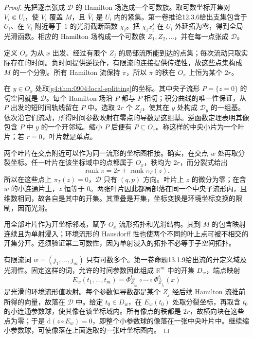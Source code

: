 \begin{proof}
	先把逐点张成 \(\mathcal D\) 的 Hamilton 场选成一个可数族。取可数坐标开集对 \(V_i\Subset U_i\)，使 \(V_i\) 覆盖 \(M\)，且 \(\overline V_i\) 是 \(U_i\) 内的紧集。第一卷推论12.3.6给出支集包含于 \(U_i\)、在 \(\overline V_i\) 附近等于 \(1\) 的光滑截断函数 \(\chi_i\)。把 \(\chi_i x_i^j\) 在 \(U_i\) 外延拓为零，得到全局光滑函数。相应的 Hamilton 场构成一个可数族 \(Z_1,Z_2,\ldots\)，并在每一点张成 \(\mathcal D\)。

	定义 \(O_x\) 为从 \(x\) 出发、经过有限个 \(Z_j\) 的局部流所能到达的点集；每次流动只取实际存在的时间。负时间提供逆操作，有限流的连接提供传递性，故这些点集构成 \(M\) 的一个分割。所有 Hamilton 流保持 \(\pi\)，所以 \(\pi\) 的秩在 \(O_x\) 上恒为某个 \(2r\)。

	在 \(y\in O_x\) 处取\cref{g4:thm:0904:local-splitting}的坐标。其中央子流形 \(P=\{z=0\}\) 的切空间就是 \(\mathcal D\)。每个 Hamilton 场沿 \(P\) 都与 \(P\) 相切；积分曲线的唯一性保证，从 \(P\) 出发的短时间轨线留在 \(P\) 中。选取 \(2r\) 个 \(Z_j\)，使其在 \(y\) 处构成 \(\mathcal D_y\) 的一组基。依次沿它们流动，所得时间参数映射在零点的导数是这组基。逆函数定理表明其像包含 \(P\) 中 \(y\) 的一个开邻域。缩小 \(P\) 后便有 \(P\subseteq O_x\)。称这样的中央小片为一个叶片；若 \(r=0\)，叶片就是单点。

	两个叶片在交点附近可以作为同一流形的坐标图相接。确实，在交点 \(w\) 处再取分裂坐标。任一叶片在该坐标域中的点都属于 \(O_x\)，秩均为 \(2r\)，而分裂式给出
	\[
		\operatorname{rank}\pi=2r+\operatorname{rank}\pi_T(z).
	\]
	所以在这些点上 \(\pi_T(z)=0\)，\(\mathcal D\) 只有 \((q,p)\) 方向。叶片上 \(z\) 的微分为零；在含 \(w\) 的小连通片上，\(z\) 恒等于 \(0\)。两张叶片因此都局部落在同一个中央子流形内，且维数相同，故各自是其中的开集。其重叠是开集，坐标变换是环境坐标变换的限制，因而光滑。

	用全部叶片作为开坐标邻域，赋予 \(O_x\) 流形拓扑和光滑结构。其到 \(M\) 的包含映射连续且为单射浸入；环境流形的 Hausdorff 性也使两个不同的叶上点可被不相交的开集分开。还须验证第二可数性，因为单射浸入的拓扑不必等于子空间拓扑。

	有限流词 \(w=(j_1,\ldots,j_m)\) 只有可数多个。第一卷命题13.1.9给出流的开定义域及光滑性。固定这样的词，允许的时间参数因此组成 \(\mathbb R^m\) 中的开集 \(D_w\)，端点映射
	\[
		E_w(t_1,\ldots,t_m)
		=\Phi_{Z_{j_m}}^{t_m}\circ\cdots\circ\Phi_{Z_{j_1}}^{t_1}(x)
	\]
	是光滑的环境流形值映射。每个参数偏导数都是某个 \(Z_j\) 经后续 Hamilton 流推前所得的向量，故落在 \(\mathcal D\) 中。给定 \(t_0\in D_w\)，在 \(E_w(t_0)\) 处取分裂坐标，再取含 \(t_0\) 的小连通参数球，使其像在该坐标域内。所有像点的秩都是 \(2r\)，故横向块在这些点为零；于是 \(\mathrm{d}(z\circ E_w)=0\)，即整个小参数球的像落在一张中央叶片中。继续缩小参数球，可使像落在上面选取的一张叶坐标图内。


\end{proof}
